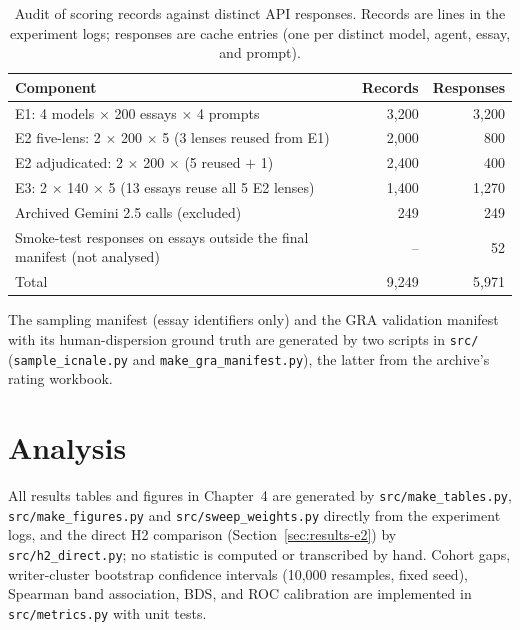 \begin{table}[htbp]
\centering
\caption[Audit of scoring records and API responses]{Audit of
scoring records against distinct API responses. Records are lines
in the experiment logs; responses are cache entries (one per
distinct model, agent, essay, and prompt).}
\label{tab:audit}
\small
\begin{tabular}{p{8.2cm} r r}
\hline
Component & Records & Responses \\
\hline
E1: 4 models $\times$ 200 essays $\times$ 4 prompts & 3{,}200 & 3{,}200 \\
E2 five-lens: 2 $\times$ 200 $\times$ 5 (3 lenses reused from E1) & 2{,}000 & 800 \\
E2 adjudicated: 2 $\times$ 200 $\times$ (5 reused $+$ 1) & 2{,}400 & 400 \\
E3: 2 $\times$ 140 $\times$ 5 (13 essays reuse all 5 E2 lenses) & 1{,}400 & 1{,}270 \\
Archived Gemini 2.5 calls (excluded) & 249 & 249 \\
Smoke-test responses on essays outside the final manifest (not analysed) & -- & 52 \\
\hline
Total & 9{,}249 & 5{,}971 \\
\hline
\end{tabular}
\end{table}

The sampling manifest (essay identifiers only) and the GRA
validation manifest with its human-dispersion ground truth are
generated by two scripts in \texttt{src/}
(\texttt{sample\_icnale.py} and \texttt{make\_gra\_manifest.py}),
the latter from the archive's rating workbook.

\section*{Analysis}
All results tables and figures in Chapter~4 are generated by
\texttt{src/}\allowbreak\texttt{make\_tables.py}, \texttt{src/}\allowbreak\texttt{make\_figures.py} and
\texttt{src/}\allowbreak\texttt{sweep\_weights.py} directly from the experiment logs,
and the direct H2 comparison (Section~\ref{sec:results-e2}) by
\texttt{src/}\allowbreak\texttt{h2\_direct.py};
no statistic is computed or
transcribed by hand. Cohort gaps, writer-cluster bootstrap confidence
intervals (10{,}000 resamples, fixed seed), Spearman band association,
BDS, and ROC calibration are implemented in \texttt{src/}\allowbreak\texttt{metrics.py}
with unit tests.

